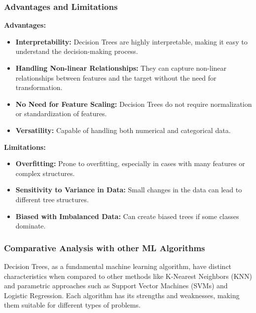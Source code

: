 \documentclass[letterpaper,10pt]{article}
\begin{document}
\subsubsection{Advantages and Limitations}
\textbf{Advantages:}
\begin{itemize}
    \item \textbf{Interpretability:} Decision Trees are highly interpretable, making it easy to understand the decision-making process.
    \item \textbf{Handling Non-linear Relationships:} They can capture non-linear relationships between features and the target without the need for transformation.
    \item \textbf{No Need for Feature Scaling:} Decision Trees do not require normalization or standardization of features.
    \item \textbf{Versatility:} Capable of handling both numerical and categorical data.
\end{itemize}

\textbf{Limitations:}
\begin{itemize}
    \item \textbf{Overfitting:} Prone to overfitting, especially in cases with many features or complex structures.
    \item \textbf{Sensitivity to Variance in Data:} Small changes in the data can lead to different tree structures.
    \item \textbf{Biased with Imbalanced Data:} Can create biased trees if some classes dominate.
\end{itemize}

\subsubsection{Comparative Analysis with other ML Algorithms}
Decision Trees, as a fundamental machine learning algorithm, have distinct characteristics when compared to other methods like K-Nearest Neighbors (KNN) and parametric approaches such as Support Vector Machines (SVMs) and Logistic Regression. Each algorithm has its strengths and weaknesses, making them suitable for different types of problems.
\end{document}
